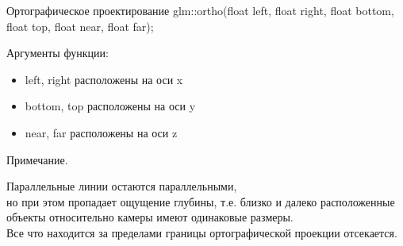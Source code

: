 \documentclass{beamer}
\begin{document}
	\begin{frame}{Ортографическое проектирование}
		glm::ortho(float left, float right, float bottom, float top, float near, float far);
		
		Аргументы функции:
		\begin{itemize}
			\item 
			left, right расположены на оси x
			\item 
			bottom, top расположены на оси y
			\item 
			near, far расположены на оси z
		\end{itemize}

		Примечание.

		Параллельные линии остаются параллельными,
		\\ но при этом пропадает ощущение глубины, т.е. близко и далеко расположенные объекты относительно камеры имеют одинаковые размеры.
		\\ Все что находится за пределами границы ортографической проекции отсекается.


	\end{frame}
	
\end{document}
